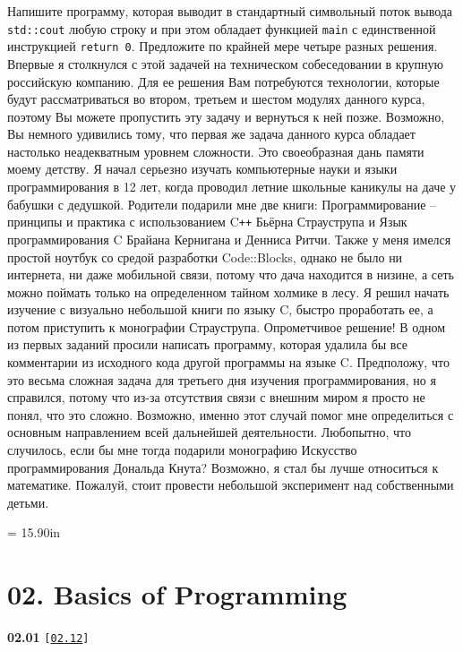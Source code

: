\documentclass[a4paper,12pt]{article}
\begin{document}
Напишите программу, которая выводит в стандартный символьный поток вывода \lstinline{std::cout} любую строку и при этом обладает функцией \lstinline{main} с единственной инструкцией \lstinline{return 0}. Предложите по крайней мере четыре разных решения. Впервые я столкнулся с этой задачей на техническом собеседовании в крупную российскую компанию. Для ее решения Вам потребуются технологии, которые будут рассматриваться во втором, третьем и шестом модулях данного курса, поэтому Вы можете пропустить эту задачу и вернуться к ней позже. Возможно, Вы немного удивились тому, что первая же задача данного курса обладает настолько неадекватным уровнем сложности. Это своеобразная дань памяти моему детству. Я начал серьезно изучать компьютерные науки и языки программирования в 12 лет, когда проводил летние школьные каникулы на даче у бабушки с дедушкой. Родители подарили мне две книги: Программирование -- принципы и практика с использованием C\texttt{++} Бьёрна Страуструпа и Язык программирования C Брайана Кернигана и Денниса Ритчи. Также у меня имелся простой ноутбук со средой разработки Code::Blocks, однако не было ни интернета, ни даже мобильной связи, потому что дача находится в низине, а сеть можно поймать только на определенном тайном холмике в лесу. Я решил начать изучение с визуально небольшой книги по языку C, быстро проработать ее, а потом приступить к монографии Страуструпа. Опрометчивое решение! В одном из первых заданий просили написать программу, которая удалила бы все комментарии из исходного кода другой программы на языке C. Предположу, что это весьма сложная задача для третьего дня изучения программирования, но я справился, потому что из-за отсутствия связи с внешним миром я просто не понял, что это сложно. Возможно, именно этот случай помог мне определиться с основным направлением всей дальнейшей деятельности. Любопытно, что случилось, если бы мне тогда подарили монографию Искусство программирования Дональда Кнута? Возможно, я стал бы лучше относиться к математике. Пожалуй, стоит провести небольшой эксперимент над собственными детьми.



\newpage\thispagestyle{empty}\pdfpageheight = 15.90in\enlargethispage{100in}

\section{02. Basics of Programming}

{\large \textbf{02.01} \texttt{[\href{https://github.com/i-s-m-mipt/Education/blob/master/projects/examples/source/02.12.cpp}{\texttt{02.12}}]}}
\end{document}
